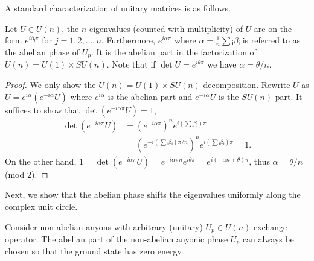 

A standard characterization of unitary matrices is as follows.

\begin{lemma}
  Let $U ∈ U(n)$, the $n$ eigenvalues (counted with multiplicity) of $U$ are on the form $e^{iβⱼπ}$ for $j = 1,2,…,n$. Furthermore, $e^{iα\pi}$ where $α = \frac{1}{n}∑ⱼ βⱼ$ is referred to as the abelian phase of $U_p$. It is the abelian part in the factorization of $U(n) = U(1) \times SU(n)$. Note that if $\det U = e^{iθπ}$ we have $α = θ/n$.
\end{lemma}

\begin{proof}
  We only show the $U(n) = U(1) \times SU(n)$ decomposition.
  Rewrite $U$ as $U = e^{iα}\left( e^{-iα} U \right)$ where $e^{iα}$ is the abelian part and $e^{-iα} U$ is the $SU(n)$ part. It suffices to show that $\det \left( e^{-iαπ} U \right) = 1$,
  \begin{equation}
    \begin{aligned}
      \det \left( e^{-iαπ} U \right)
      &= \left(e^{-iαπ}\right)^n e^{i\left(∑ⱼ βⱼ\right)π} \\
      &= \left(e^{-i\left(∑ⱼ βⱼ\right)π/n}\right)^n e^{i\left(∑ⱼ βⱼ\right)π} = 1.
    \end{aligned}
  \end{equation}
  On the other hand, $1 = \det \left( e^{-iαπ} U \right) = e^{-iαπn} e^{iθπ} = e^{i(-αn+θ)π}$, thus $α = θ/n$ (mod $2$).
\end{proof}

Next, we show that the abelian phase shifts the eigenvalues uniformly along the complex unit circle.

\begin{proposition}
  Consider non-abelian anyons with arbitrary (unitary) $U_p ∈ U(n)$ exchange operator. The abelian part of the non-abelian anyonic phase $U_p$ can always be chosen so that the ground state has zero energy.
\end{proposition}

